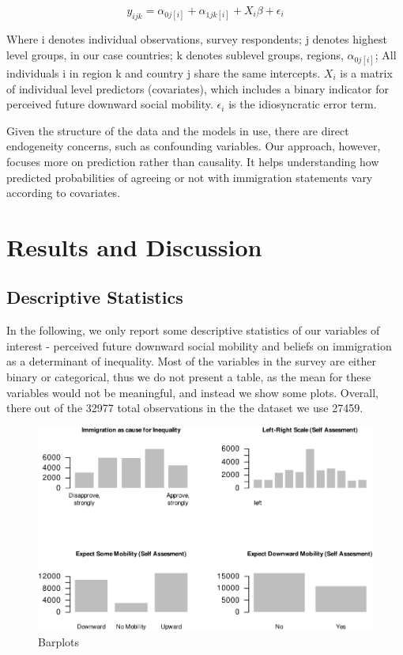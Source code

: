 \documentclass[
  11pt,
]{article}
\begin{document}
\[ y_{ijk} = \alpha_{0j[i]} + \alpha_{1jk[i]} + X_i\beta + \epsilon_{i} \]

Where i denotes individual observations, survey respondents; j denotes
highest level groups, in our case countries; k denotes sublevel groups,
regions, \(\alpha_{0j[i]}\); All individuals i in region k and country j
share the same intercepts. \(X_i\) is a matrix of individual level
predictors (covariates), which includes a binary indicator for perceived
future downward social mobility. \(\epsilon_{i}\) is the idiosyncratic
error term.

Given the structure of the data and the models in use, there are direct
endogeneity concerns, such as confounding variables. Our approach,
however, focuses more on prediction rather than causality. It helps
understanding how predicted probabilities of agreeing or not with
immigration statements vary according to covariates.

\hypertarget{results-and-discussion}{%
\section{Results and Discussion}\label{results-and-discussion}}

\hypertarget{descriptive-statistics}{%
\subsection{\texorpdfstring{\textbf{Descriptive
Statistics}}{Descriptive Statistics}}\label{descriptive-statistics}}

In the following, we only report some descriptive statistics of our
variables of interest - perceived future downward social mobility and
beliefs on immigration as a determinant of inequality. Most of the
variables in the survey are either binary or categorical, thus we do not
present a table, as the mean for these variables would not be
meaningful, and instead we show some plots. Overall, there out of the
32977 total observations in the the dataset we use 27459.

\vspace{0.4cm}

\begin{figure}
\centering
\includegraphics{AQM-paper_files/figure-latex/descriptiveBar-1.pdf}
\caption{Barplots}
\end{figure}
\end{document}
